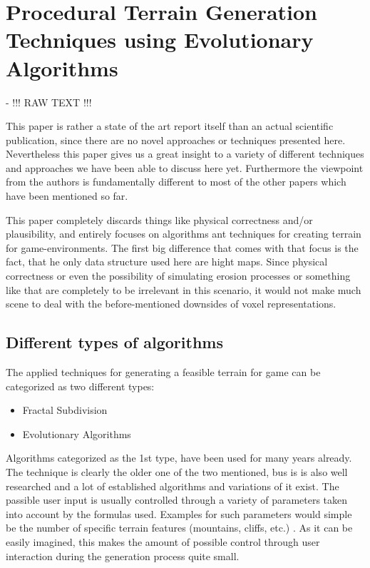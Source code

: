 \section{Procedural Terrain Generation Techniques using Evolutionary Algorithms}

\cite{raffe2012survey} - !!! RAW TEXT !!!

This paper \cite{raffe2012survey} is rather a state of the art report itself than an actual scientific publication, since there are no novel approaches or techniques presented here. Nevertheless this paper gives us a great insight to a variety of different techniques and approaches we have been able to discuss here yet. Furthermore the viewpoint from the authors is fundamentally different to most of the other papers which have been mentioned so far.

This paper completely discards things like physical correctness and/or plausibility, and entirely focuses on algorithms ant techniques for creating terrain for game-environments. The first big difference that comes with that focus is the fact, that he only data structure used here are hight maps. Since physical correctness or even the possibility of simulating erosion processes or something like that are completely to be irrelevant in this scenario, it would not make much scene to deal with the before-mentioned downsides of voxel representations.

\subsection{Different types of algorithms}
The applied techniques for generating a feasible terrain for game can be categorized as two different types:
\begin{itemize}
	\item Fractal Subdivision 
	\item Evolutionary Algorithms
\end{itemize}

Algorithms categorized as the 1st type, have been used for many years already. The technique is clearly the older one of the two mentioned, bus is is also well researched and a lot of established algorithms and variations of it exist. The passible user input is usually controlled through a variety of parameters taken into account by the formulas used. Examples for such parameters would simple be the number of specific terrain features (mountains, cliffs, etc.) \cite{raffe2012survey}. As it can be easily imagined, this makes the amount of possible control through user interaction during the generation process quite small.

